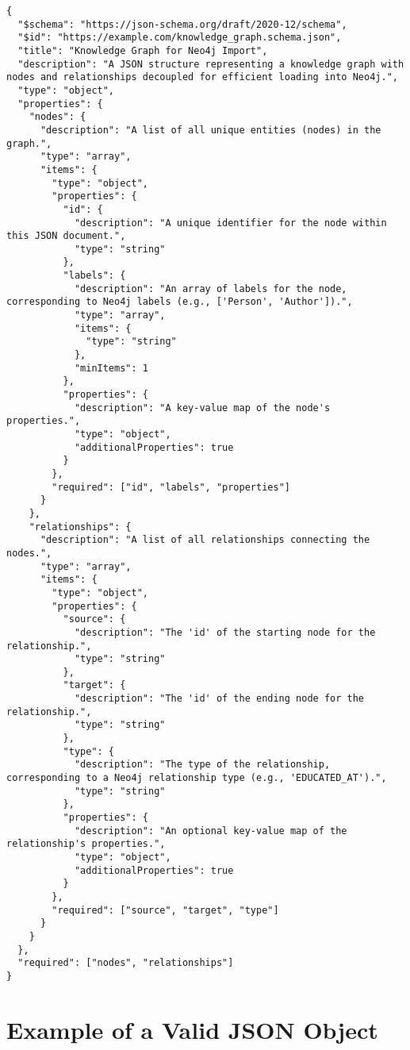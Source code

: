 \begin{lstlisting}[style=json, caption={The JSON Schema defining the structure for the knowledge graph output.}, label={lst:kg_schema}]
{
  "$schema": "https://json-schema.org/draft/2020-12/schema",
  "$id": "https://example.com/knowledge_graph.schema.json",
  "title": "Knowledge Graph for Neo4j Import",
  "description": "A JSON structure representing a knowledge graph with nodes and relationships decoupled for efficient loading into Neo4j.",
  "type": "object",
  "properties": {
    "nodes": {
      "description": "A list of all unique entities (nodes) in the graph.",
      "type": "array",
      "items": {
        "type": "object",
        "properties": {
          "id": {
            "description": "A unique identifier for the node within this JSON document.",
            "type": "string"
          },
          "labels": {
            "description": "An array of labels for the node, corresponding to Neo4j labels (e.g., ['Person', 'Author']).",
            "type": "array",
            "items": {
              "type": "string"
            },
            "minItems": 1
          },
          "properties": {
            "description": "A key-value map of the node's properties.",
            "type": "object",
            "additionalProperties": true
          }
        },
        "required": ["id", "labels", "properties"]
      }
    },
    "relationships": {
      "description": "A list of all relationships connecting the nodes.",
      "type": "array",
      "items": {
        "type": "object",
        "properties": {
          "source": {
            "description": "The 'id' of the starting node for the relationship.",
            "type": "string"
          },
          "target": {
            "description": "The 'id' of the ending node for the relationship.",
            "type": "string"
          },
          "type": {
            "description": "The type of the relationship, corresponding to a Neo4j relationship type (e.g., 'EDUCATED_AT').",
            "type": "string"
          },
          "properties": {
            "description": "An optional key-value map of the relationship's properties.",
            "type": "object",
            "additionalProperties": true
          }
        },
        "required": ["source", "target", "type"]
      }
    }
  },
  "required": ["nodes", "relationships"]
}
\end{lstlisting}

\section{Example of a Valid JSON Object}

